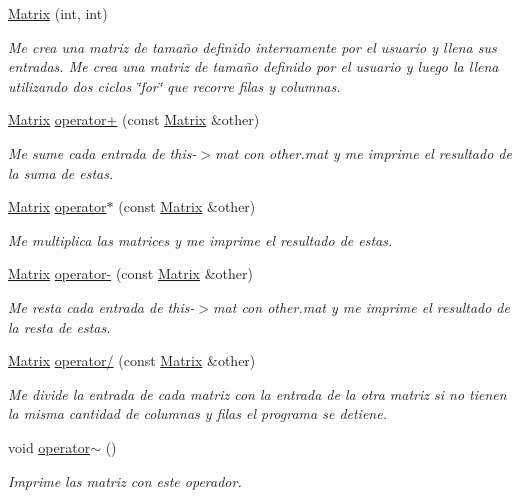 \begin{DoxyCompactItemize}
\item 
\hyperlink{class_matrix_adfbeb67cc3c43d96c53f881d79f919cb}{Matrix} (int, int)
\begin{DoxyCompactList}\small\item\em Me crea una matriz de tamaño definido internamente por el usuario y llena sus entradas. Me crea una matriz de tamaño definido por el usuario y luego la llena utilizando dos ciclos \char`\"{}for\char`\"{} que recorre filas y columnas. \end{DoxyCompactList}\item 
\hyperlink{class_matrix}{Matrix} \hyperlink{class_matrix_a78ca86168259fdd09159c500dc002f82}{operator+} (const \hyperlink{class_matrix}{Matrix} \&other)
\begin{DoxyCompactList}\small\item\em Me sume cada entrada de this-\/$>$mat con other.\+mat y me imprime el resultado de la suma de estas. \end{DoxyCompactList}\item 
\hyperlink{class_matrix}{Matrix} \hyperlink{class_matrix_ab5c13f2f7f2d01419453cd4ec42d9613}{operator$\ast$} (const \hyperlink{class_matrix}{Matrix} \&other)
\begin{DoxyCompactList}\small\item\em Me multiplica las matrices y me imprime el resultado de estas. \end{DoxyCompactList}\item 
\hyperlink{class_matrix}{Matrix} \hyperlink{class_matrix_aa18b9161e4a64e26906136ecfa8fdc9b}{operator-\/} (const \hyperlink{class_matrix}{Matrix} \&other)
\begin{DoxyCompactList}\small\item\em Me resta cada entrada de this-\/$>$mat con other.\+mat y me imprime el resultado de la resta de estas. \end{DoxyCompactList}\item 
\hyperlink{class_matrix}{Matrix} \hyperlink{class_matrix_a4320a1911a7421dc819da700b6b38a9d}{operator/} (const \hyperlink{class_matrix}{Matrix} \&other)
\begin{DoxyCompactList}\small\item\em Me divide la entrada de cada matriz con la entrada de la otra matriz si no tienen la misma cantidad de columnas y filas el programa se detiene. \end{DoxyCompactList}\item 
void \hyperlink{class_matrix_a328b2fe96eea6640526cc255b1f5a797}{operator$\sim$} ()\hypertarget{class_matrix_a328b2fe96eea6640526cc255b1f5a797}{}\label{class_matrix_a328b2fe96eea6640526cc255b1f5a797}

\begin{DoxyCompactList}\small\item\em Imprime las matriz con este operador. \end{DoxyCompactList}\end{DoxyCompactItemize}


